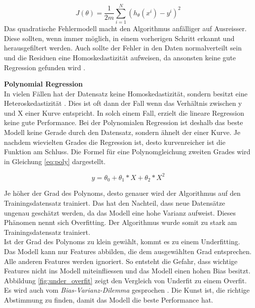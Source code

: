 \begin{equation}\label{eq:cost_function}
J(\theta) = \frac{1}{2m} \sum_{i=1}^{N} (h_\theta(x^i) - y^i)^2
\end{equation}
Das quadratische Fehlermodell macht den Algorithmus anfälliger auf Ausreisser. Diese sollten, wenn immer möglich, in einem vorherigen Schritt erkannt und herausgefiltert werden. Auch sollte der Fehler in den Daten normalverteilt sein und die Residuen eine Homoskedastizität aufweisen, da ansonsten keine gute Regression gefunden wird \cite{gradient_descent, gradient_descent_2, gradient_descent_3}.

\textbf{Polynomial Regression}\\
In vielen Fällen hat der Datensatz keine Homoskedastizität, sondern besitzt eine Heteroskedastizität \cite{poly}. Dies ist oft dann der Fall wenn das Verhältnis zwischen y und X einer Kurve entspricht. In solch einem Fall, erzielt die lineare Regression keine gute Performance.
Bei der Polynomialen Regression ist deshalb das beste Modell keine Gerade durch den Datensatz, sondern ähnelt der einer Kurve. Je nachdem wievielten Grades die Regression ist, desto kurvenreicher ist die Funktion am Schluss. Die Formel für eine Polynomgleichung zweiten Grades wird in Gleichung \eqref{eq:poly} dargestellt.

\begin{equation}\label{eq:poly}
y = \theta_0 + \theta_1 * X + \theta_2 * X^2
\end{equation}

Je höher der Grad des Polynoms, desto genauer wird der Algorithmus auf den Trainingsdatensatz trainiert. Das hat den Nachteil, dass neue Datensätze ungenau geschätzt werden, da das Modell eine hohe Varianz aufweist. Dieses Phänomen nennt sich Overfitting. Der Algorithmus wurde somit zu stark am Trainingsdatensatz trainiert.\\
Ist der Grad des Polynoms zu klein gewählt, kommt es zu einem Underfitting. Das Modell kann nur Features abbilden, die dem ausgewählten Grad entsprechen. Alle anderen Features werden ignoriert. So entsteht die Gefahr, dass wichtige Features nicht ins Modell miteinfliessen und das Modell einen hohen Bias besitzt. Abbildung \ref{fig:under_overfit} zeigt den Vergleich von Underfit zu einem Overfit.\\
Es wird auch vom \textit{Bias-Varianz-Dilemma} gesprochen \cite{bias_variance, bias_variance_2}. Die Kunst ist, die richtige Abstimmung zu finden, damit das Modell die beste Performance hat.

